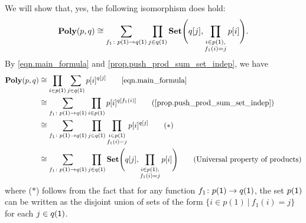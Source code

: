\documentclass[Book-Poly]{subfiles}
\begin{document}
\begin{exercise}
\begin{solution}
\begin{longenum}
\item We will show that, yes, the following isomorphism does hold:
\[
	\textbf{Poly}(p,q)\cong\sum_{f_1\colon p(\textsf{1})\to q(\textsf{1})}\prod_{j\in q(\textsf{1})}\textbf{Set}\Bigg(q[j],\prod_{\substack{i \in p(\textsf{1}), \\ f_1(i) = j}}p[i]\Bigg).
\]
By \eqref{eqn.main_formula} and \cref{prop.push_prod_sum_set_indep}, we have
\begin{align*}
    \poly(p, q) &\iso \prod_{i \in p(\1)} \sum_{j \in q(\1)} p[i]^{q[j]} \tag*{\eqref{eqn.main_formula}} \\
    &\iso \sum_{f_1 \colon p(\1) \to q(\1)} \prod_{i \in p(\1)} p[i]^{q[f_1(i)]} \tag{\cref{prop.push_prod_sum_set_indep}} \\
    &\iso \sum_{f_1 \colon p(\1) \to q(\1)} \prod_{j \in q(\1)} \prod_{\substack{i \in p(\1) \\ f_1(i) = j}} p[i]^{q[j]} \tag{$\ast$} \\
    &\iso \sum_{f_1\colon p(\1)\to q(\1)}\prod_{j\in q(\1)}\smset\Bigg(q[j],\prod_{\substack{i \in p(\1), \\ f_1(i) = j}}p[i]\Bigg) \tag{Universal property of products}
\end{align*}
where ($\ast$) follows from the fact that for any function $f_1 \colon p(\textsf{1}) \to q(\textsf{1})$, the set $p(\textsf{1})$ can be written as the disjoint union of sets of the form $\{i \in p(1) \ | \ f_1(i) = j\}$ for each $j \in q(\textsf{1})$.


\end{longenum}
\end{solution}
\end{exercise}
\end{document}
